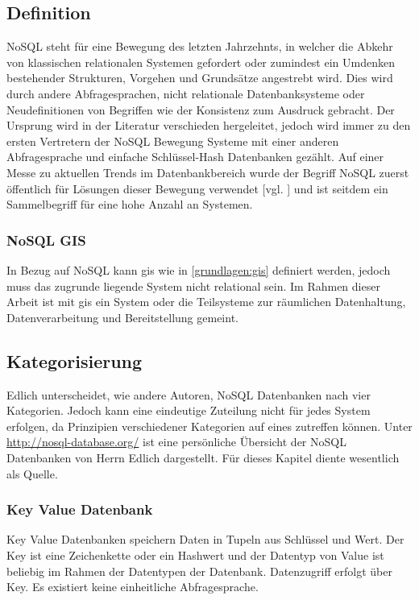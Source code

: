 \subsection{Definition}

NoSQL steht für eine Bewegung des letzten Jahrzehnts, in welcher die Abkehr von klassischen relationalen Systemen gefordert oder zumindest ein Umdenken bestehender Strukturen, Vorgehen und Grundsätze angestrebt wird.
Dies wird durch andere Abfragesprachen, nicht relationale Datenbanksysteme oder Neudefinitionen von Begriffen wie der Konsistenz zum Ausdruck gebracht.
Der Ursprung wird in der Literatur verschieden hergeleitet, jedoch wird immer zu den ersten Vertretern der NoSQL Bewegung Systeme mit einer anderen Abfragesprache und einfache Schlüssel-Hash Datenbanken gezählt.
Auf einer Messe zu aktuellen Trends im Datenbankbereich wurde der Begriff NoSQL zuerst öffentlich für Lösungen dieser Bewegung verwendet [vgl. \cite{website:originnosql}] und ist seitdem ein Sammelbegriff für eine hohe Anzahl an Systemen.

\subsubsection{NoSQL GIS}

In Bezug auf NoSQL kann \Gls{gis} wie in \ref{grundlagen:gis} definiert werden, jedoch muss das zugrunde liegende System nicht relational sein.
Im Rahmen dieser Arbeit ist mit \Gls{gis} ein System oder die Teilsysteme zur räumlichen Datenhaltung, Datenverarbeitung und Bereitstellung gemeint.

\subsection{Kategorisierung}
Edlich unterscheidet, wie andere Autoren, NoSQL Datenbanken nach vier Kategorien.
Jedoch kann eine eindeutige Zuteilung nicht für jedes System erfolgen, da Prinzipien verschiedener Kategorien auf eines zutreffen können.
Unter \url{http://nosql-database.org/} ist eine persönliche Übersicht der NoSQL Datenbanken von Herrn Edlich dargestellt.
Für dieses Kapitel diente wesentlich \cite{beamer:nosql} als Quelle.


\subsubsection{Key Value Datenbank}

Key Value Datenbanken speichern Daten in Tupeln aus Schlüssel und Wert.
Der Key ist eine Zeichenkette oder ein Hashwert und der Datentyp von Value ist beliebig im Rahmen der Datentypen der Datenbank.
Datenzugriff erfolgt über Key.
Es existiert keine einheitliche Abfragesprache.

